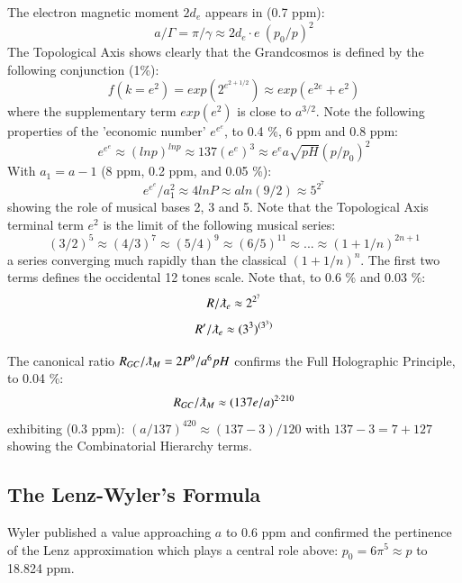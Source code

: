 \documentclass[twoside,draft]{article}
\begin{document}
\begin{sloppypar}
The electron magnetic moment $2d_e$ appears in (0.7 ppm):
\begin{equation}
a/\Gamma = \pi/\gamma \approx 2d_e \cdot e ~(p_0/p)^2 
\end{equation}
The Topological Axis shows clearly that the Grandcosmos is defined by the following conjunction (1\%):
\begin{equation}
f(k = e^{2}) = exp(2^{e^{2+1/2}}) \approx exp(e^{2e}+e^{2})
\end{equation}
where the supplementary term $exp(e^2)$ is close to $a^{3/2}$. Note the following properties of the 'economic number' $e^{e^e}$, to 
0.4 \%, 6 ppm and 0.8 ppm:
\begin{equation}
e^{e^e}\approx (lnp)^{lnp} \approx 137 (e^{e})^3 \approx e^e a \sqrt{pH} (p/p_0)^2 
\end{equation}
With $a_1 = a-1$ (8 ppm, 0.2 ppm, and 0.05 \%):
\begin{equation}
e^{e^e}/a_1^2 \approx 4 ln P \approx a ln(9/2) \approx 5^{2^7}
\end{equation}
showing the role of musical bases 2, 3 and 5. Note that the Topological Axis terminal term $e^2$ is the limit of the following musical series:
$$(3/2)^5 \approx (4/3)^7   \approx (5/4)^9  \approx  (6/5)^{11}  \approx   ...  \approx  (1+1/n)^{2n+1}  $$  
a series converging much rapidly than the classical $(1+1/n)^n$. The first two terms defines the occidental 12 tones scale.
Note that, to 0.6 \% and 0.03 \%:
\begin{equation}
R/\lambdabar_e \approx 2^{2^7}
\end{equation}
\begin{equation}
R^{\prime}/\lambdabar_e \approx (3^3)^{(3^3)}
\end{equation}

The canonical ratio $R_{GC}/\lambdabar_M = 2P^9/a^6pH $ confirms the Full Holographic Principle, to 0.04 \%:
\begin{equation}
R_{GC}/\lambdabar_M  \approx (137e/a)^{2 \cdot 210}  
\end{equation}
exhibiting (0.3 ppm): $ (a/137)^{420} \approx (137 - 3)/120 $  
with $137 - 3 = 7 + 127$ showing the Combinatorial Hierarchy terms\cite{Sanchez1}. 


\subsection {The Lenz-Wyler's Formula}
Wyler published a value approaching $a$ to 0.6 ppm and confirmed the pertinence of the Lenz approximation which plays a central role above: $p_{0} = 6\pi^{5} \approx p$ to 18.824 ppm.


\end{sloppypar}
\end{document}
